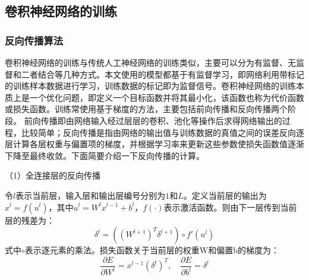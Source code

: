 \subsection{卷积神经网络的训练}
\subsubsection{反向传播算法}
卷积神经网络的训练与传统人工神经网络的训练类似，主要可以分为有监督、无监督和二者结合等几种方式。本文使用的模型都基于有监督学习，即网络利用带标记的训练样本数据进行学习，训练数据的标记即为监督信号。卷积神经网络的训练本质上是一个优化问题，即定义一个目标函数并将其最小化，该函数也称为代价函数或损失函数。训练常使用基于梯度的方法，主要包括前向传播和反向传播两个阶段。
前向传播即由网络输入经过层层的卷积、池化等操作后求得网络输出的过程，比较简单；反向传播是指由网络的输出值与训练数据的真值之间的误差反向逐层计算各层权重与偏置项的梯度，并根据学习率来更新这些参数使损失函数值逐渐下降至最终收敛。下面简要介绍一下反向传播的计算\cite{bouvrie2006notes}。

（1）全连接层的反向传播

令$l$表示当前层，输入层和输出层编号分别为$1$和$L$。定义当前层的输出为$x^l = f(u^l)$，其中$u^l = W^l x^{l-1} + b^l$，$f(\cdot)$表示激活函数。则由下一层传到当前层的残差为：
\begin{equation}\label{eq:3_1_残差_全连接层}
\delta^{l} = ((W^{l+1})^T \delta^{l+1} ) \circ f'(u^l)
\end{equation}
式中$\circ$表示逐元素的乘法。损失函数关于当前层的权重W和偏置b的梯度为：
\begin{equation}
\frac{\partial E}{\partial W^l} = x^{l-1}( \delta^l )^T, \quad
\frac{\partial E}{\partial b^l}  = \delta^l
\end{equation}


